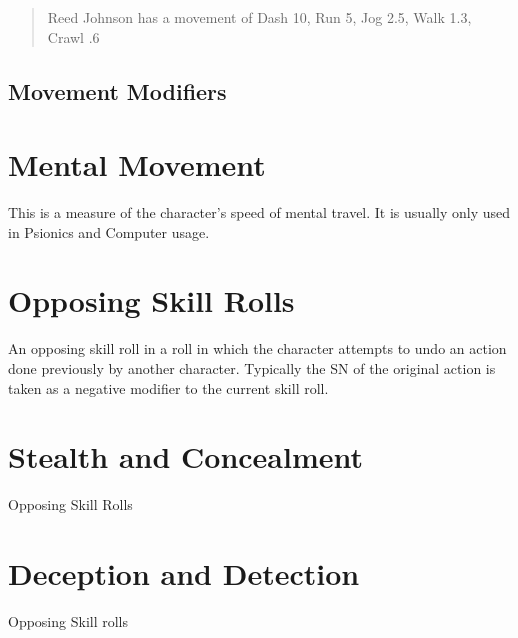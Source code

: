 

\begin{quotation}
Reed Johnson has a movement of Dash 10, Run 5, Jog 2.5, Walk 1.3, Crawl .6
\end{quotation}

\subsection{Movement Modifiers}



\section{Mental Movement}
This is a measure of the character's speed of mental travel. It is 
usually only used in Psionics and Computer usage.

\section{Opposing Skill Rolls}

An opposing skill roll in a roll in which the character attempts to 
undo an action done previously by another character. Typically the SN 
of the original action is taken as a negative modifier to the current 
skill roll.

\section{Stealth and Concealment}

Opposing Skill Rolls

\section{Deception and Detection}

Opposing Skill rolls

